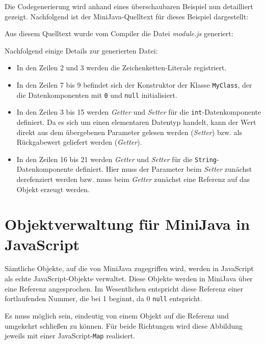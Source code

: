 \pagebreak
Die Codegenerierung wird anhand eines überschaubaren Beispiel nun detailliert gezeigt. Nachfolgend ist der MiniJava-Quelltext für dieses Beispiel dargestellt:



Aus diesem Quelltext wurde vom Compiler die Datei \emph{module.js} generiert:



Nachfolgend einige Details zur generierten Datei:

\begin{itemize}
    \item In den Zeilen 2 und 3 werden die Zeichenketten-Literale registriert. 
    \item In den Zeilen 7 bis 9 befindet sich der Konstruktor der Klasse \lstinline{MyClass}, der die Datenkomponenten mit \lstinline{0} und \lstinline{null} initialisiert.
    \item In den Zeilen 3 bis 15 werden \emph{Getter} und \emph{Setter} für die \lstinline{int}-Datenkomponente definiert. Da es sich um einen elementaren Datentyp handelt, kann der Wert direkt aus dem übergebenen Parameter gelesen werden (\emph{Setter}) bzw. als Rückgabewert geliefert werden (\emph{Getter}).
    \item In den Zeilen 16 bis 21 werden \emph{Getter} und \emph{Setter} für die \lstinline{String}-Datenkomponente definiert. Hier muss der Parameter beim \emph{Setter} zunächst derefenziert werden bzw. muss beim \emph{Getter} zunächst eine Referenz auf das Objekt erzeugt werden.
\end{itemize}

\section{Objektverwaltung für MiniJava in JavaScript}

Sämtliche Objekte, auf die von MiniJava zugegriffen wird, werden in JavaScript als echte JavaScript-Objekte verwaltet. Diese Objekte werden in MiniJava über eine Referenz angesprochen. Im Wesentlichen entspricht diese Referenz einer fortlaufenden Nummer, die bei 1 beginnt, da 0 \lstinline{null} entspricht.

Es muss möglich sein, eindeutig von einem Objekt auf die Referenz und umgekehrt schließen zu können. Für beide Richtungen wird diese Abbildung jeweils mit einer Java\-Script-\lstinline{Map} realisiert.

